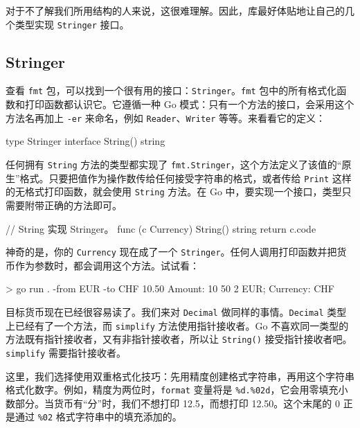 对于不了解我们所用结构的人来说，这很难理解。因此，库最好体贴地让自己的几个类型实现 \texttt{Stringer} 接口。

\subsection{Stringer}

查看 \texttt{fmt} 包，可以找到一个很有用的接口：\texttt{Stringer}。\texttt{fmt} 包中的所有格式化函数和打印函数都认识它。它遵循一种 Go 模式：只有一个方法的接口，会采用这个方法名再加上 \texttt{-er} 来命名，例如 \texttt{Reader}、\texttt{Writer} 等等。来看看它的定义：

\begin{gocode}[]
type Stringer interface {
    String() string
}
\end{gocode}

任何拥有 \texttt{String} 方法的类型都实现了 \texttt{fmt.Stringer}，这个方法定义了该值的“原生”格式。只要把值作为操作数传给任何接受字符串的格式，或者传给 \texttt{Print} 这样的无格式打印函数，就会使用 \texttt{String} 方法。在 Go 中，要实现一个接口，类型只需要附带正确的方法即可。

\begin{gocode}[title={代码清单 6.29 \texttt{currency.go}：实现 \texttt{Currency} 的 \texttt{Stringer}}]
// String 实现 Stringer。
func (c Currency) String() string {
    return c.code
}
\end{gocode}

神奇的是，你的 \texttt{Currency} 现在成了一个 \texttt{Stringer}。任何人调用打印函数并把货币作为参数时，都会调用这个方法。试试看：

\begin{shellcode}[]
> go run . -from EUR -to CHF 10.50
Amount: {{10 50 2} EUR}; Currency: CHF
\end{shellcode}

目标货币现在已经很容易读了。我们来对 \texttt{Decimal} 做同样的事情。\texttt{Decimal} 类型上已经有了一个方法，而 \texttt{simplify} 方法使用指针接收者。Go 不喜欢同一类型的方法既有指针接收者，又有非指针接收者，所以让 \texttt{String()} 接受指针接收者吧。\texttt{simplify} 需要指针接收者。

这里，我们选择使用双重格式化技巧：先用精度创建格式字符串，再用这个字符串格式化数字。例如，精度为两位时，\texttt{format} 变量将是 \texttt{\%d.\%02d}，它会用零填充小数部分。当货币有“分”时，我们不想打印 12.5，而想打印 12.50。这个末尾的 0 正是通过 \texttt{\%02} 格式字符串中的填充添加的。

